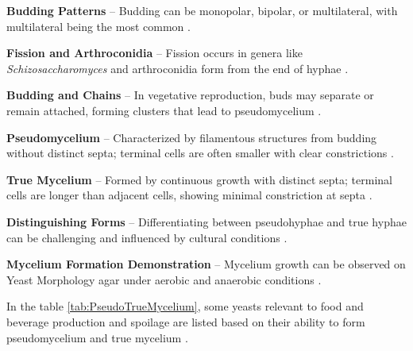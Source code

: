 \textbf{Budding Patterns} – Budding can be monopolar, bipolar, or multilateral, with multilateral being the most common \cite{L2-YeastClass}.

\textbf{Fission and Arthroconidia} – Fission occurs in genera like \textit{Schizosaccharomyces} and arthroconidia form from the end of hyphae \cite{L2-YeastClass}.


\textbf{Budding and Chains} – In vegetative reproduction, buds may separate or remain attached, forming clusters that lead to pseudomycelium \cite*{L2-YeastClass}.

\textbf{Pseudomycelium} – Characterized by filamentous structures from budding without distinct septa; terminal cells are often smaller with clear constrictions \cite*{L2-YeastClass}.

\textbf{True Mycelium} – Formed by continuous growth with distinct septa; terminal cells are longer than adjacent cells, showing minimal constriction at septa \cite*{L2-YeastClass}.

\textbf{Distinguishing Forms} – Differentiating between pseudohyphae and true hyphae can be challenging and influenced by cultural conditions \cite*{L2-YeastClass}.

\textbf{Mycelium Formation Demonstration} – Mycelium growth can be observed on Yeast Morphology agar under aerobic and anaerobic conditions \cite*{L2-YeastClass}.

In the table \ref*{tab:PseudoTrueMycelium}, some yeasts relevant to food and beverage production and spoilage are listed based on their ability to form pseudomycelium and true mycelium \cite*{L2-YeastClass}.

